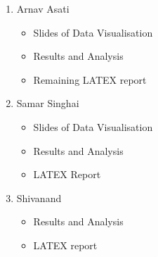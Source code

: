 \documentclass{article}
\begin{document}
\begin{enumerate}
\item Arnav Asati
\begin{itemize}
  \item Slides of Data Visualisation
  \item Results and Analysis
  \item Remaining LATEX report
\end{itemize}
\item Samar Singhai 
\begin{itemize}
  \item Slides of Data Visualisation
  \item Results and Analysis
  \item LATEX Report
\end{itemize}
\item Shivanand
\begin{itemize}
  \item Results and Analysis
  \item LATEX report
\end{itemize}
\end{enumerate}
\end{document}
